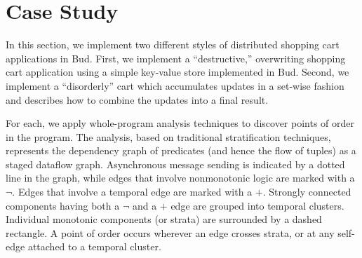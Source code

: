 \section{Case Study}
\label{sec:case}





In this section, we implement two different styles of distributed shopping cart
applications in Bud.  First, we implement a ``destructive,'' overwriting
shopping cart application using a simple key-value store implemented in Bud.
Second, we implement a ``disorderly'' cart which accumulates updates in a 
set-wise fashion and describes how to combine the updates into a final result.

For each, we apply whole-program analysis techniques to discover points of 
order in the program.  The analysis, based on traditional stratification
techniques, represents the dependency graph of predicates (and hence the 
flow of tuples) as a staged dataflow graph.  Asynchronous message sending
is indicated by a dotted line in the graph, while edges that involve 
nonmonotonic logic are marked with a $\lnot$.  Edges that involve a temporal 
edge are marked with a $+$.  Strongly connected components having both a $\lnot$ and a $+$ edge are grouped into temporal clusters.  Individual monotonic components 
(or strata) are surrounded by a dashed rectangle.  A point of order occurs
wherever an edge crosses strata, or at any self-edge attached to a temporal cluster.

